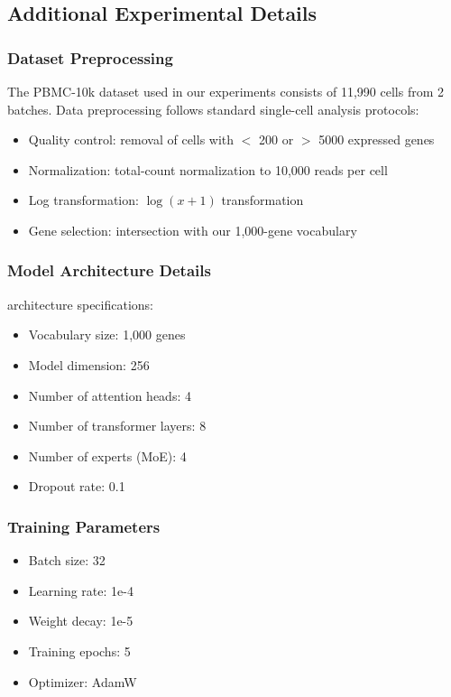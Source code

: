 
\subsection{Additional Experimental Details}

\subsubsection{Dataset Preprocessing}
The PBMC-10k dataset used in our experiments consists of 11,990 cells from 2 batches. Data preprocessing follows standard single-cell analysis protocols:
\begin{itemize}
\item Quality control: removal of cells with $<$ 200 or $>$ 5000 expressed genes
\item Normalization: total-count normalization to 10,000 reads per cell
\item Log transformation: $\log(x + 1)$ transformation
\item Gene selection: intersection with our 1,000-gene vocabulary
\end{itemize}

\subsubsection{Model Architecture Details}
\bioformer{} architecture specifications:
\begin{itemize}
\item Vocabulary size: 1,000 genes
\item Model dimension: 256
\item Number of attention heads: 4
\item Number of transformer layers: 8
\item Number of experts (MoE): 4
\item Dropout rate: 0.1
\end{itemize}

\subsubsection{Training Parameters}
\begin{itemize}
\item Batch size: 32
\item Learning rate: 1e-4
\item Weight decay: 1e-5
\item Training epochs: 5
\item Optimizer: AdamW
\end{itemize}

